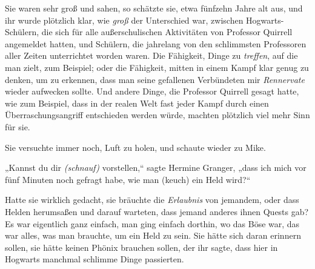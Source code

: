 Sie waren sehr groß und sahen, so schätzte sie, etwa fünfzehn Jahre alt aus, und ihr wurde plötzlich klar, wie \emph{groß} der Unterschied war, zwischen Hogwarts-Schülern, die sich für alle außerschulischen Aktivitäten von Professor Quirrell angemeldet hatten, und Schülern, die jahrelang von den schlimmsten Professoren aller Zeiten unterrichtet worden waren. Die Fähigkeit, Dinge zu \emph{treffen}, auf die man zielt, zum Beispiel; oder die Fähigkeit, mitten in einem Kampf klar genug zu denken, um zu erkennen, dass man seine gefallenen Verbündeten mir \emph{Rennervate} wieder aufwecken sollte. Und andere Dinge, die Professor Quirrell gesagt hatte, wie zum Beispiel, dass in der realen Welt fast jeder Kampf durch einen Überraschungsangriff entschieden werden würde, machten plötzlich viel mehr Sinn für sie.

Sie versuchte immer noch, Luft zu holen, und schaute wieder zu Mike.

„Kannst du dir \emph{(schnauf)} vorstellen,“ sagte Hermine Granger, „dass ich mich vor fünf Minuten noch gefragt habe, wie man (keuch) ein Held wird?“

Hatte sie wirklich gedacht, sie bräuchte die \emph{Erlaubnis} von jemandem, oder dass Helden herumsaßen und darauf warteten, dass jemand anderes ihnen Quests gab? Es war eigentlich ganz einfach, man ging einfach dorthin, wo das Böse war, das war alles, was man brauchte, um ein Held zu sein. Sie hätte sich daran erinnern sollen, sie hätte keinen Phönix brauchen sollen, der ihr sagte, dass hier in Hogwarts manchmal schlimme Dinge passierten.

